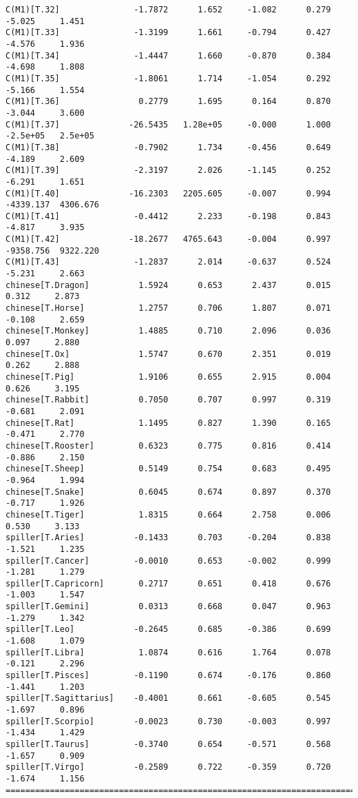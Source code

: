 \documentclass[12pt,fleqn]{article}\usepackage{../common}
\begin{document}
\begin{verbatim}
C(M1)[T.32]               -1.7872      1.652     -1.082      0.279        -5.025     1.451
C(M1)[T.33]               -1.3199      1.661     -0.794      0.427        -4.576     1.936
C(M1)[T.34]               -1.4447      1.660     -0.870      0.384        -4.698     1.808
C(M1)[T.35]               -1.8061      1.714     -1.054      0.292        -5.166     1.554
C(M1)[T.36]                0.2779      1.695      0.164      0.870        -3.044     3.600
C(M1)[T.37]              -26.5435   1.28e+05     -0.000      1.000      -2.5e+05   2.5e+05
C(M1)[T.38]               -0.7902      1.734     -0.456      0.649        -4.189     2.609
C(M1)[T.39]               -2.3197      2.026     -1.145      0.252        -6.291     1.651
C(M1)[T.40]              -16.2303   2205.605     -0.007      0.994     -4339.137  4306.676
C(M1)[T.41]               -0.4412      2.233     -0.198      0.843        -4.817     3.935
C(M1)[T.42]              -18.2677   4765.643     -0.004      0.997     -9358.756  9322.220
C(M1)[T.43]               -1.2837      2.014     -0.637      0.524        -5.231     2.663
chinese[T.Dragon]          1.5924      0.653      2.437      0.015         0.312     2.873
chinese[T.Horse]           1.2757      0.706      1.807      0.071        -0.108     2.659
chinese[T.Monkey]          1.4885      0.710      2.096      0.036         0.097     2.880
chinese[T.Ox]              1.5747      0.670      2.351      0.019         0.262     2.888
chinese[T.Pig]             1.9106      0.655      2.915      0.004         0.626     3.195
chinese[T.Rabbit]          0.7050      0.707      0.997      0.319        -0.681     2.091
chinese[T.Rat]             1.1495      0.827      1.390      0.165        -0.471     2.770
chinese[T.Rooster]         0.6323      0.775      0.816      0.414        -0.886     2.150
chinese[T.Sheep]           0.5149      0.754      0.683      0.495        -0.964     1.994
chinese[T.Snake]           0.6045      0.674      0.897      0.370        -0.717     1.926
chinese[T.Tiger]           1.8315      0.664      2.758      0.006         0.530     3.133
spiller[T.Aries]          -0.1433      0.703     -0.204      0.838        -1.521     1.235
spiller[T.Cancer]         -0.0010      0.653     -0.002      0.999        -1.281     1.279
spiller[T.Capricorn]       0.2717      0.651      0.418      0.676        -1.003     1.547
spiller[T.Gemini]          0.0313      0.668      0.047      0.963        -1.279     1.342
spiller[T.Leo]            -0.2645      0.685     -0.386      0.699        -1.608     1.079
spiller[T.Libra]           1.0874      0.616      1.764      0.078        -0.121     2.296
spiller[T.Pisces]         -0.1190      0.674     -0.176      0.860        -1.441     1.203
spiller[T.Sagittarius]    -0.4001      0.661     -0.605      0.545        -1.697     0.896
spiller[T.Scorpio]        -0.0023      0.730     -0.003      0.997        -1.434     1.429
spiller[T.Taurus]         -0.3740      0.654     -0.571      0.568        -1.657     0.909
spiller[T.Virgo]          -0.2589      0.722     -0.359      0.720        -1.674     1.156
==========================================================================================
\end{verbatim}
\end{document}

